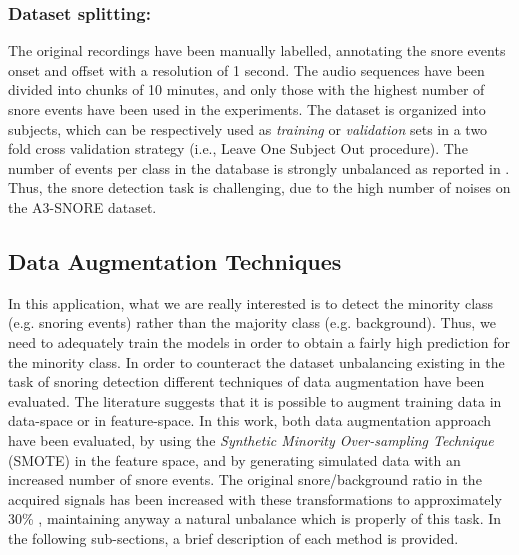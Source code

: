 \subsubsection{Dataset splitting:}
The original recordings have been manually labelled, annotating the snore events onset and offset with a resolution of 1 second. The audio sequences have been divided into chunks of 10 minutes, and only those with the highest number of snore events have been used in the experiments. 
The dataset is organized into subjects, which can be respectively used as \emph{training} or \emph{validation} sets in a two fold cross validation strategy (i.e., Leave One Subject Out procedure). The number of events per class in the database is strongly unbalanced as reported in . Thus, the snore detection task is challenging, due to the high number of noises on the A3-SNORE dataset. 

\begin{table}[ht]
	\centering
	\caption[A3-SNORE dataset]{Difference of recording times for each class, divided by snorers.}
	\label{a3snore} 
\end{table}

\subsection{Data Augmentation Techniques}
\label{ssec:data-augmentation}
In this application, what we are really interested is to detect the minority class (e.g. snoring events) rather than the majority class (e.g. background). Thus, we need to adequately train the models in order to obtain a fairly high prediction for the minority class. In order to counteract the dataset unbalancing existing in the task of snoring detection different techniques of data augmentation have been evaluated. 
The literature suggests that it is possible to augment training data in data-space or in feature-space. 
In this work, both data augmentation approach have been evaluated, by using the \emph{Synthetic Minority Over-sampling Technique} (SMOTE) \cite{chawla2002smote} in the feature space, and by generating simulated data with an increased number of snore events. 
The original snore/background ratio in the acquired signals has been increased with these transformations to approximately 30\% \cite{young1997nasal}, maintaining anyway a natural unbalance which is properly of this task.
In the following sub-sections, a brief description of each method is provided.

